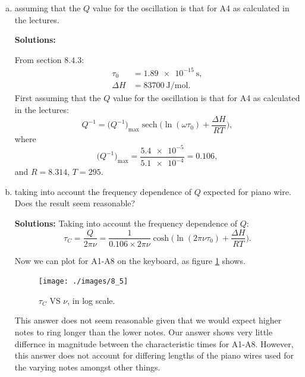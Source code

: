 \documentclass[12pt]{article}
\DeclareMathOperator{\sech}{sech}
\begin{document}
\begin{enumerate}[a)]
  \item assuming that the $Q$ value for the oscillation is that for A4 as calculated in the lectures.

        \textbf{Solutions:}

        From section $8.4.3$:
        \begin{align}
          \tau_0   & = \SI{1.89e-15}{\second},        \\
          \Delta H & = \SI{83700}{\joule \per \mole}.
        \end{align}
        First assuming that the $Q$ value for the oscillation is that for A4 as calculated in the lectures:
        \begin{equation}
          Q^{-1} = \big( Q^{-1} \big)_\text{max} \sech \bigg( \ln(\omega \tau_0) + \frac{ \Delta H }{ R T } \bigg),
        \end{equation}
        where
        \begin{equation}
          \big( Q^{-1} \big)_\text{max} = \frac{ \num{5.4e-5} }{ \num{5.1e-4} } = 0.106,
        \end{equation}
        and $R = 8.314$, $T = 295$.
  \item taking into account the frequency dependence of $Q$ expected for piano wire. Does the result seem reasonable?

        \textbf{Solutions:}
        Taking into account the frequency dependence of $Q$:
        \begin{equation}
          \tau_C = \frac{ Q }{ 2 \pi \nu } = \frac{ 1 }{ 0.106 \times 2 \pi \nu } \cosh \bigg( \ln(2 \pi \nu \tau_0) + \frac{ \Delta H }{ R T } \bigg).
        \end{equation}

        Now we can plot for A1-A8 on the keyboard, as figure \ref{fig:tauc} shows.
        \begin{figure}[h]
          \centering
          \texttt{[image: ./images/8\_5]}
          \caption{$\tau_C$ VS $\nu$, in log scale.}
          \label{fig:tauc}
        \end{figure}

        This answer does not seem reasonable given that we would expect higher notes to
        ring longer than the lower notes. Our answer shows very little differnce in
        magnitude between the characteristic times for A1-A8.
        However, this answer does not account for differing lengths of the piano wires
        used for the varying notes amongst other things.

\end{enumerate}




% 
% 

\end{document}
